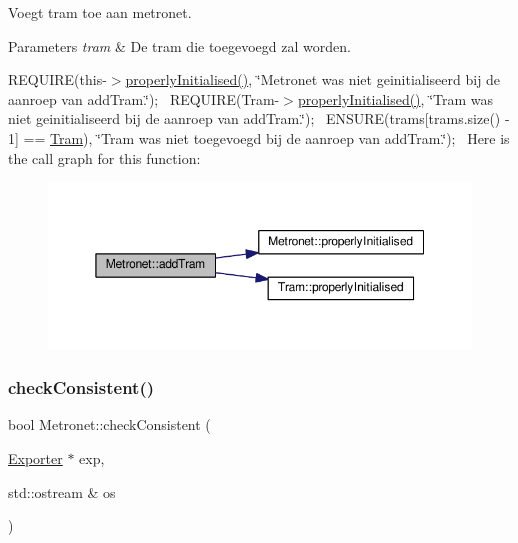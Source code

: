 Voegt tram toe aan metronet. 


\begin{DoxyParams}{Parameters}
{\em tram} & De tram die toegevoegd zal worden.\\
\hline
\end{DoxyParams}
R\+E\+Q\+U\+I\+RE(this-\/$>$\hyperlink{class_metronet_a3d2adce29a947f162924279b766de645}{properly\+Initialised()}, \char`\"{}\+Metronet was niet geinitialiseerd bij de aanroep van add\+Tram.\char`\"{});~\newline
R\+E\+Q\+U\+I\+RE(Tram-\/$>$\hyperlink{class_metronet_a3d2adce29a947f162924279b766de645}{properly\+Initialised()}, \char`\"{}\+Tram was niet geinitialiseerd bij de aanroep van add\+Tram.\char`\"{});~\newline
E\+N\+S\+U\+RE(trams\mbox{[}trams.\+size() -\/ 1\mbox{]} == \hyperlink{class_tram}{Tram}), \char`\"{}\+Tram was niet toegevoegd bij de aanroep van add\+Tram.\char`\"{});~\newline
Here is the call graph for this function\+:
\nopagebreak
\begin{figure}[H]
\begin{center}
\leavevmode
\includegraphics[width=350pt]{class_metronet_a3a01132772f4a367d83af40a3c02e224_cgraph}
\end{center}
\end{figure}
\mbox{\label{class_metronet_abd223e3d0f745e3460a247dc667fce69}} 
\subsubsection{\texorpdfstring{check\+Consistent()}{checkConsistent()}}
{\footnotesize\ttfamily bool Metronet\+::check\+Consistent (\begin{DoxyParamCaption}\item[{\hyperlink{class_exporter}{Exporter} $\ast$}]{exp,  }\item[{std\+::ostream \&}]{os }\end{DoxyParamCaption})}



